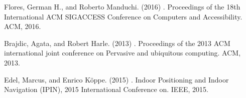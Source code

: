 \documentclass[11pt]{article}
\begin{document}
\begin{thebibliography}{}

Flores, German H., and Roberto Manduchi.
\newblock (2016)
.
\newblock Proceedings of the 18th International ACM SIGACCESS Conference on Computers and Accessibility. ACM, 2016.


Brajdic, Agata, and Robert Harle.
\newblock (2013)
.
\newblock Proceedings of the 2013 ACM international joint conference on Pervasive and ubiquitous computing. ACM, 2013.


Edel, Marcus, and Enrico Köppe.
\newblock (2015)
.
\newblock Indoor Positioning and Indoor Navigation (IPIN), 2015 International Conference on. IEEE, 2015.



\end{thebibliography}
\end{document}
